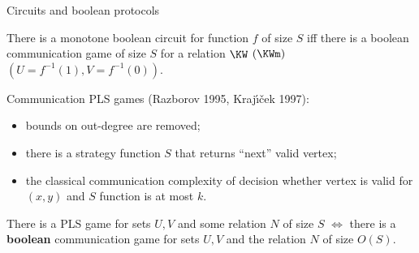 \begin{frame}{Circuits and boolean protocols}

    \begin{theorem}[Pudl{\'{a}}k 2010, S 2017]
        There is a {\color{blue} monotone} boolean circuit for function $f$ of size $S$ iff there is a
        boolean communication game of size $S$ for a relation $\KW$ {\color{blue}$(\KWm)$} $(U =
        f^{-1}(1), V = f^{-1}(0))$.
    \end{theorem}

    \pause
    Communication PLS games (Razborov 1995, Kraj{\'{\i}}{\v{c}}ek 1997):
    \begin{itemize}
        \item bounds on out-degree are removed;
        \item there is a strategy function $S$ that returns ``next'' valid vertex;
        \item the classical communication complexity of decision whether vertex is valid for $(x, y)$ and
            $S$ function is at most $k$.
    \end{itemize}

    \pause
    \begin{theorem}
        There is a PLS game for sets $U, V$ and some relation $N$ of size $S$ $\Leftrightarrow$ there is
        a \textbf{boolean} communication game for sets $U, V$ and the relation $N$ of size $O(S)$.
    \end{theorem}

\end{frame}



